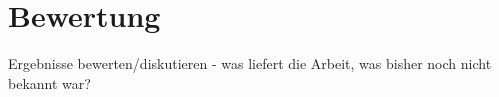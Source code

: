 \chapter{Bewertung}

Ergebnisse bewerten/diskutieren - was liefert die Arbeit, was bisher noch nicht bekannt war?